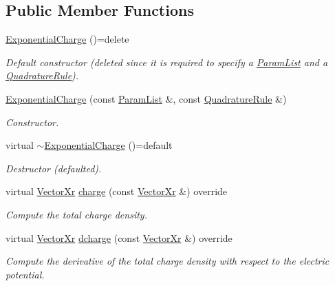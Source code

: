 \subsection*{Public Member Functions}
\begin{DoxyCompactItemize}
\item 
\hypertarget{classExponentialCharge_aa231654787ef3e6f60f0df672de44f0d}{\hyperlink{classExponentialCharge_aa231654787ef3e6f60f0df672de44f0d}{Exponential\-Charge} ()=delete}\label{classExponentialCharge_aa231654787ef3e6f60f0df672de44f0d}

\begin{DoxyCompactList}\small\item\em Default constructor (deleted since it is required to specify a \hyperlink{classParamList}{Param\-List} and a \hyperlink{classQuadratureRule}{Quadrature\-Rule}). \end{DoxyCompactList}\item 
\hyperlink{classExponentialCharge_ad643c7a5be928315affe78e164387bd0}{Exponential\-Charge} (const \hyperlink{classParamList}{Param\-List} \&, const \hyperlink{classQuadratureRule}{Quadrature\-Rule} \&)
\begin{DoxyCompactList}\small\item\em Constructor. \end{DoxyCompactList}\item 
\hypertarget{classExponentialCharge_a4440f979418ee3b20fb2e366933c6aff}{virtual \hyperlink{classExponentialCharge_a4440f979418ee3b20fb2e366933c6aff}{$\sim$\-Exponential\-Charge} ()=default}\label{classExponentialCharge_a4440f979418ee3b20fb2e366933c6aff}

\begin{DoxyCompactList}\small\item\em Destructor (defaulted). \end{DoxyCompactList}\item 
virtual \hyperlink{typedefs_8h_aae6cee78ed9cd8f234ed8cb48682548a}{Vector\-Xr} \hyperlink{classExponentialCharge_a97ff25e546dee1ee5fec866b290ec999}{charge} (const \hyperlink{typedefs_8h_aae6cee78ed9cd8f234ed8cb48682548a}{Vector\-Xr} \&) override
\begin{DoxyCompactList}\small\item\em Compute the total charge density. \end{DoxyCompactList}\item 
virtual \hyperlink{typedefs_8h_aae6cee78ed9cd8f234ed8cb48682548a}{Vector\-Xr} \hyperlink{classExponentialCharge_a06f7a60ee2bce4590e2a12286aa0e9eb}{dcharge} (const \hyperlink{typedefs_8h_aae6cee78ed9cd8f234ed8cb48682548a}{Vector\-Xr} \&) override
\begin{DoxyCompactList}\small\item\em Compute the derivative of the total charge density with respect to the electric potential. \end{DoxyCompactList}\end{DoxyCompactItemize}
